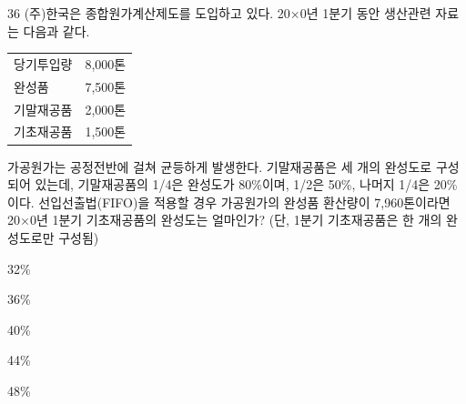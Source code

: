 \begin{question}{36}
(주)한국은 종합원가계산제도를 도입하고 있다. 20×0년 1분기 동안 생산관련 자료는 다음과 같다.

{\small\centering
\begin{tabular}{lr}
\hline
당기투입량 & 8,000톤 \\
완성품 & 7,500톤 \\
기말재공품 & 2,000톤 \\
기초재공품 & 1,500톤 \\
\hline
\end{tabular}\par}

가공원가는 공정전반에 걸쳐 균등하게 발생한다. 기말재공품은 세 개의 완성도로 구성되어 있는데, 기말재공품의 1/4은 완성도가 80\%이며, 1/2은 50\%, 나머지 1/4은 20\%이다. 선입선출법(FIFO)을 적용할 경우 가공원가의 완성품 환산량이 7,960톤이라면 20×0년 1분기 기초재공품의 완성도는 얼마인가? (단, 1분기 기초재공품은 한 개의 완성도로만 구성됨)
\begin{choices}
  \item 32\%
  \item 36\%
  \item 40\%
  \item 44\%
  \item 48\%
\end{choices}
\end{question}

